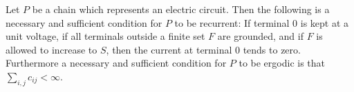 Let $P$ be a chain which represents an electric circuit. Then the following is a necessary and sufficient condition for $P$ to be recurrent: If terminal 0 is kept at a unit voltage, if all terminals outside a finite set $F$ are grounded, and if $F$ is allowed to increase to $S$, then the current at terminal 0 tends to zero. Furthermore a necessary and sufficient condition for $P$ to be ergodic is that $\sum_{i,j} c_{ij} < \infty$.
